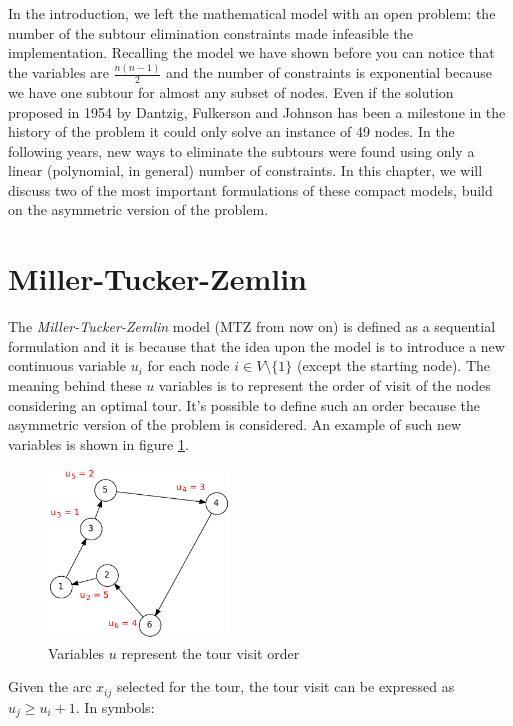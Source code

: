 In the introduction, we left the mathematical model with an open problem: the
number of the subtour elimination constraints made infeasible the
implementation. Recalling the model we have shown before you can notice that
the variables are $\frac{n(n-1)}{2}$ and the number of constraints is
exponential because we have one subtour for almost any subset of nodes. Even if
the solution proposed in 1954 by Dantzig, Fulkerson and Johnson has been a
milestone in the history of the problem it could only solve an instance of 49
nodes. In the following years, new ways to eliminate the subtours were found
using only a linear (polynomial, in general) number of constraints. In this
chapter, we will discuss two of the most important formulations of these
compact models, build on the asymmetric version of the problem.

\section{Miller-Tucker-Zemlin}
The \emph{Miller-Tucker-Zemlin} model
\citep{miller1960integer}\citep{sawik2016note} (MTZ from now on) is defined as a
sequential formulation and it is because that the idea upon the model is to
introduce a new continuous variable $u_i$ for each node $i \in V \setminus
\{1\}$ (except the starting node). The meaning behind these $u$ variables is
to represent the order of visit of the nodes considering an optimal tour. It's
possible to define such an order because the asymmetric version of the problem
is considered. An example of such new variables is shown in figure
\ref{fig:MTZ_example}.

\begin{figure}
    \centering
    \includegraphics[width=0.43\textwidth]{figures/mtz}
    \caption[MTZ example]{Variables $u$ represent the tour visit order}
    \label{fig:MTZ_example}
\end{figure}

Given the arc $x_{ij}$ selected for the tour, the tour visit can be expressed
as $u_j \geq u_i + 1$. In symbols:


